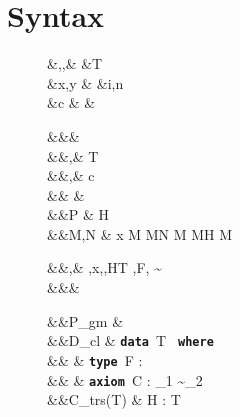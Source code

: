 \documentclass[screen,nonacm,manuscript,review]{acmart} %
\begin{document}
\section{Syntax}\label{sec:sfc-syntax}
\begin{figure}[ht]
 \centering
 \begin{syntax}
  &\TyVar,\beta,\Co &\qquad{} &T \\
  &x,y &\qquad{} &i,n \in {} \\
  &c & &
 \end{syntax}
 \begin{syntax}
  &&\kappa \bnfeq& \star \bnfor \kappa \to \kappa \bnfor \shl{\sigma \sim \tau}\\
  &&\tau,\sigma \bnfeq& \TyVar \bnfor T \bnfor \tau \to \tau \bnfor \tau\App\tau \bnfor \Forall {\TyVar\co\kappa} \tau \bnfor {} \bnfor \shl{\Co}\\
  &&\nu,\Co \bnfeq& c \bnfor {}\tau \bnfor \Sym\Co \bnfor \trans\nu\Co %
 \bnfor \Forall {\TyVar\co\kappa} \Co \bnfor \Co\At\tau %
 \bnfor \nu\App\Co \bnfor \Left \Co \bnfor \Right \Co\\  %
  && \phi \bnfeq& \tau \bnfor \Co\\
  &&P \bnfeq& H\App \many{\TyVar\co\kappa} \\
  &&M,N \bnfeq& x \bnfor {} M \bnfor M\App N \bnfor \TLam{\phi\co\kappa} M \bnfor M\App \tau \bnfor H \bnfor \Case M  \bnfor \shl{\Cast \Tm \Co}\\

 \end{syntax}
 \begin{syntax}
  &&\TEnv,\Delta \bnfeq& \empt \bnfor \TEnv,x\co\tau \bnfor \TEnv,\TyVar\co\kappa \bnfor \TEnv,H\co T \bnfor \TEnv,F\co\tau \bnfor \TEnv, \Co \co \tau\sim\sigma\\
  &&\Subst \bnfeq& \empt \bnfor \Set{\many{\TyVar \mapsto \tau}}
 \end{syntax}

 \begin{syntax}
  &&P_{gm} \bnfeq&  \mathrel{;} \\
  &&D_{cl} \bnfeq& \textbf{\texttt{data }}\App T\co\many{\kappa} \to \star\App \textbf{\texttt{ where }}\App {} \\
 && \bnfor& \textbf{\texttt{type }}\App F : \many\kappa \to \kappa\\
 && \bnfor& \textbf{\texttt{axiom }}\App C\App \many{\TyVar\co\kappa} : \sigma_1 \sim \sigma_2\\
  &&C_{trs}(T) \bnfeq& H : \Forall {\many{\TyVar\co\kappa}} { \many\sigma \to T\many\TyVar}\\
 \end{syntax}


\end{figure}
\end{document}
